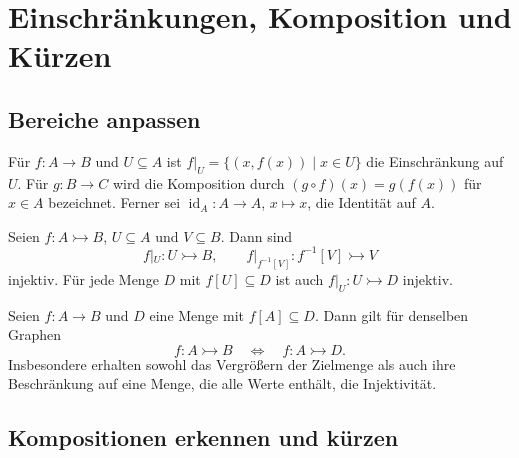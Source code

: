 \chapter{Einschränkungen, Komposition und Kürzen}
\label{b06guide:ch:composition}

\section{Bereiche anpassen}

\begin{definition}
Für $f\colon A\to B$ und $U\subseteq A$ ist
$f|_U=\{(x,f(x))\mid x\in U\}$ die Einschränkung auf $U$.
Für $g\colon B\to C$ wird die Komposition durch
$(g\circ f)(x)=g(f(x))$ für $x\in A$ bezeichnet.
Ferner sei $\operatorname{id}_A\colon A\to A$, $x\mapsto x$,
die Identität auf $A$.
\end{definition}

\begin{theorem}
\label{b06guide:thm:restriction}
Seien $f\colon A\rightarrowtail B$, $U\subseteq A$ und
$V\subseteq B$. Dann sind
\[
 f|_U\colon U\rightarrowtail B,
 \qquad
 f|_{f^{-1}[V]}\colon f^{-1}[V]\rightarrowtail V
\]
injektiv. Für jede Menge $D$ mit $f[U]\subseteq D$ ist
auch $f|_U\colon U\rightarrowtail D$ injektiv.
\end{theorem}

\begin{theorem}
\label{b06guide:thm:codomain}
Seien $f\colon A\to B$ und $D$ eine Menge mit $f[A]\subseteq D$.
Dann gilt für denselben Graphen
\[
 f\colon A\rightarrowtail B
 \quad\Longleftrightarrow\quad
 f\colon A\rightarrowtail D.
\]
Insbesondere erhalten sowohl das Vergrößern der Zielmenge als
auch ihre Beschränkung auf eine Menge, die alle Werte enthält,
die Injektivität.
\end{theorem}

\section{Kompositionen erkennen und kürzen}

